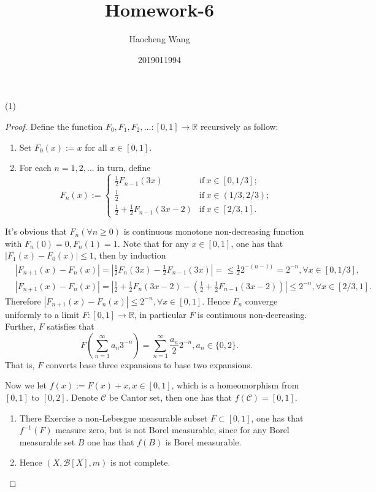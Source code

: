 \documentclass[a4paper]{article}
\title{Homework-6}
\author{Haocheng Wang \and 2019011994}
\begin{document}
\maketitle
(1)\begin{proof}
Define the function $F_0, F_1, F_2, \dots: [0, 1] \to \mathbb{R}$ recursively as follow:\begin{enumerate}[label = \arabic*.]
    \item Set $F_0(x) := x$ for all $x \in [0, 1]$.
    \item For each $n = 1, 2, \dots$ in turn, define \[
    F_n(x) := \begin{cases}
        \frac{1}{2}F_{n - 1}(3x)    &\text{if}\ x \in [0, 1/3];\\
        \frac{1}{2} &\text{if}\ x \in (1/3, 2/3);\\
        \frac{1}{2} + \frac{1}{2}F_{n - 1}(3x - 2)  &\text{if}\ x \in [2/3, 1].
    \end{cases}
    \]
\end{enumerate}
It's obvious that $F_n (\forall n \geq 0)$ is continuous monotone non-decreasing function with $F_n(0) = 0, F_n(1) = 1$.
Note that for any $x \in [0, 1]$, one has that $|F_1(x) - F_0(x)| \leq 1$, then 
by induction\begin{align*}
&|F_{n + 1}(x) - F_n(x)| = |\frac{1}{2}F_n(3x) - \frac{1}{2}F_{n - 1}(3x)| = \leq \frac{1}{2}2^{-(n - 1)} = 2^{-n}, \forall x \in [0, 1/3],\\
&|F_{n + 1}(x) - F_n(x)| = |\frac{1}{2} + \frac{1}{2}F_n(3x - 2) - (\frac{1}{2} + \frac{1}{2}F_{n - 1}(3x - 2))|
\leq  2^{-n}, \forall x \in [2/3, 1].
\end{align*}
Therefore $|F_{n + 1}(x) - F_n(x)| \leq 2^{-n}, \forall x \in [0, 1]$. Hence $F_n$ converge uniformly to a limit 
$F: [0, 1] \to \mathbb{R}$, in particular $F$ is continuous non-decreasing. Further, $F$ satisfies that 
$$
F(\sum_{n = 1}^\infty a_n3^{-n}) = \sum_{n = 1}^\infty \frac{a_n}{2}2^{-n}, a_n \in \{0, 2\}.
$$That is, $F$ converts base three expansions to base two expansions.

Now we let $f(x) := F(x) + x, x \in [0, 1]$, which is a homeomorphism from $[0, 1]$ to $[0, 2]$. Denote $\mathcal{C}$ 
be Cantor set, then one has that $f(\mathcal{C}) = [0, 1]$. \begin{enumerate}[label = (\alph*)]
    \item There Exercise a non-Lebesgue measurable subset $F \subset [0, 1]$, one has that $f^{-1}(F)$ measure zero,
    but is not Borel measurable, since for any Borel measurable set $B$ one has that $f(B)$ is Borel measurable.
    \item Hence $(X, \mathcal{B}[X], m)$ is not complete.\qedhere
\end{enumerate}
\end{proof}
\end{document}
